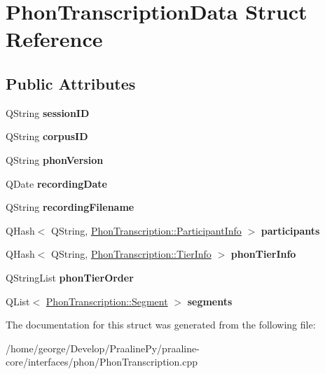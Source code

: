 \hypertarget{struct_phon_transcription_data}{}\section{Phon\+Transcription\+Data Struct Reference}
\label{struct_phon_transcription_data}
\subsection*{Public Attributes}
\begin{DoxyCompactItemize}
\item 
\mbox{\label{struct_phon_transcription_data_a598f2e5091bb471b0f777a1811364c98}} 
Q\+String {\bfseries session\+ID}
\item 
\mbox{\label{struct_phon_transcription_data_ab9a469a053ec5b9f06dd9e458e8f041c}} 
Q\+String {\bfseries corpus\+ID}
\item 
\mbox{\label{struct_phon_transcription_data_aa873f349b6fa379922ebf03ee039a43a}} 
Q\+String {\bfseries phon\+Version}
\item 
\mbox{\label{struct_phon_transcription_data_a179d072e8ea9b925cf1359ded4c55864}} 
Q\+Date {\bfseries recording\+Date}
\item 
\mbox{\label{struct_phon_transcription_data_a119c79b487a20b5fd4608146f24c53af}} 
Q\+String {\bfseries recording\+Filename}
\item 
\mbox{\label{struct_phon_transcription_data_a3ee9c43ca9972866849b589b6a267f60}} 
Q\+Hash$<$ Q\+String, \hyperlink{class_phon_transcription_1_1_participant_info}{Phon\+Transcription\+::\+Participant\+Info} $>$ {\bfseries participants}
\item 
\mbox{\label{struct_phon_transcription_data_a37f2d0b89b3e2c1d9c3f5bc5cd30cdf5}} 
Q\+Hash$<$ Q\+String, \hyperlink{class_phon_transcription_1_1_tier_info}{Phon\+Transcription\+::\+Tier\+Info} $>$ {\bfseries phon\+Tier\+Info}
\item 
\mbox{\label{struct_phon_transcription_data_ac080f0f2ce94bff778ae0def0a8ff70b}} 
Q\+String\+List {\bfseries phon\+Tier\+Order}
\item 
\mbox{\label{struct_phon_transcription_data_aaf8e467869e4de666cdfa47c0031ae62}} 
Q\+List$<$ \hyperlink{class_phon_transcription_1_1_segment}{Phon\+Transcription\+::\+Segment} $>$ {\bfseries segments}
\end{DoxyCompactItemize}


The documentation for this struct was generated from the following file\+:\begin{DoxyCompactItemize}
\item 
/home/george/\+Develop/\+Praaline\+Py/praaline-\/core/interfaces/phon/Phon\+Transcription.\+cpp\end{DoxyCompactItemize}
